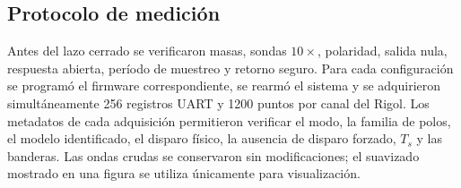\subsection{Protocolo de medición}
Antes del lazo cerrado se verificaron masas, sondas $10\times$, polaridad,
salida nula, respuesta abierta, período de muestreo y retorno seguro. Para cada
configuración se programó el firmware correspondiente, se rearmó el sistema y
se adquirieron simultáneamente 256 registros UART y 1200 puntos por canal del
Rigol. Los metadatos de cada adquisición permitieron verificar el modo, la
familia de polos, el modelo identificado, el disparo físico, la ausencia de
disparo forzado, $T_s$ y las banderas. Las ondas crudas se conservaron sin
modificaciones; el suavizado mostrado en una figura se utiliza únicamente para
visualización.
